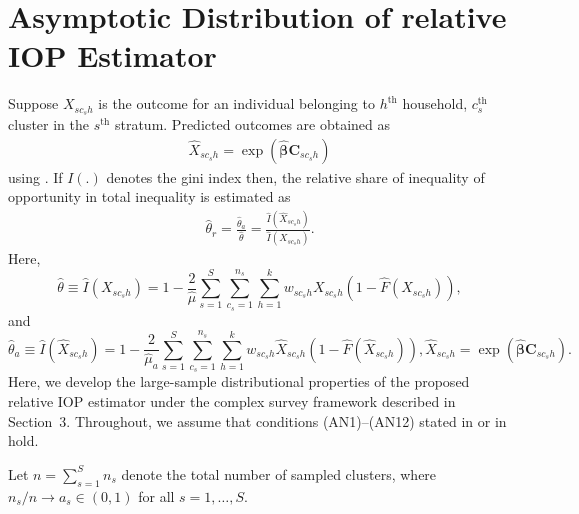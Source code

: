 \documentclass[12pt]{article}
\theoremstyle{plain}
\theoremstyle{definition}
\begin{document}
\section{Asymptotic Distribution of relative IOP Estimator}
\label{sec:asymp_iop}
Suppose $X_{sc_sh}$ is the outcome for an individual belonging to $h^{\text{th}}$ household, $c_s^{\text{th}}$ cluster in the $s^{\text{th}}$ stratum. Predicted outcomes are obtained as
\begin{align}
\label{eq:smoothed_eq}
    \hat{X}_{sc_sh} = \exp\left(\hat{\bm{\beta}}\bm{C}_{sc_sh}\right)
\end{align}
using \cite{ferreira2011measurement}.
If $I(.)$ denotes the gini index then, the relative share of inequality of opportunity in total inequality is estimated as
\begin{align}
\hat{\theta}_r=\frac{\hat{\theta}_a}{\hat{\theta}}=\frac{\hat{I}(\hat{X}_{sc_sh})}{\hat{I}({X}_{sc_sh})}.
\label{eq:IOP2Est}
\end{align}
Here,
\begin{equation}
\hat{\theta}\equiv \hat{I}({X}_{sc_sh}) = 1 - \frac{2}{\hat{\mu}} \sum_{s=1}^{S} \sum_{c_s=1}^{n_s} 
\sum_{h=1}^{k} w_{sc_sh}X_{sc_sh} \left( 1 - \hat{F}\left(X_{sc_sh}\right)\right),
\label{eq:GiniIndexEst}
\end{equation} 
and
\begin{equation}
\hat{\theta}_a\equiv \hat{I}(\hat{X}_{sc_sh}) = 1 - \frac{2}{\hat{\mu}_a} \sum_{s=1}^{S} \sum_{c_s=1}^{n_s} 
\sum_{h=1}^{k} w_{sc_sh}\hat{X}_{sc_sh} \left( 1 - \hat{F}\left(\hat{X}_{sc_sh}\right) 
\right), \hat{X}_{sc_sh} = \exp\left(\hat{\bm{\beta}}\bm{C}_{sc_sh}\right).
\label{eq:IOP1Est}
\end{equation}
Here, we develop the large-sample distributional properties of the proposed relative IOP estimator under the complex survey framework described in Section~3. Throughout, we assume that conditions (AN1)--(AN12) stated in \cite{shivam2026asymptotic} or in \cite{Bhattacharya2007} hold. 

Let
$n = \sum_{s=1}^S n_s$ denote the total number of sampled clusters, where $n_s/n \to a_s \in (0,1)$ for all $s = 1,\ldots,S$.
\end{document}
